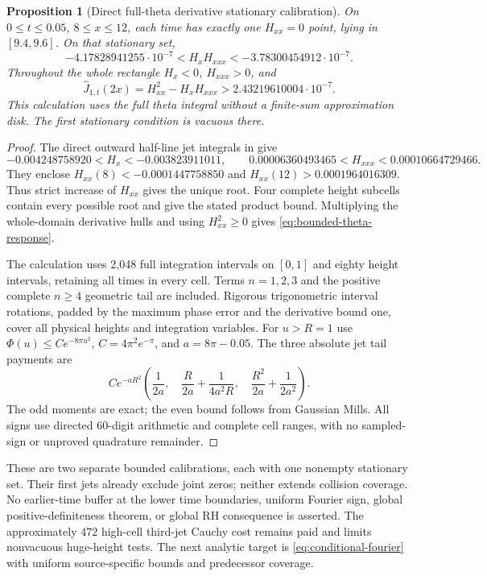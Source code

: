 \documentclass[11pt]{article}
\newtheorem{proposition}[theorem]{Proposition}
\theoremstyle{definition}
\theoremstyle{remark}
\begin{document}
\begin{proposition}[Direct full-theta derivative stationary calibration]
\label{prop:low-theta-sign}
On $0\le t\le0.05$, $8\le x\le12$, each time has exactly one
$H_{xx}=0$ point, lying in $[9.4,9.6]$. On that stationary set,
\[
 -4.17828941255\cdot10^{-7}<H_xH_{xxx}
 <-3.78300454912\cdot10^{-7}.
\]
Throughout the whole rectangle $H_x<0$, $H_{xxx}>0$, and
\begin{equation}
 \widehat J_{1,t}(2x)=H_{xx}^2-H_xH_{xxx}
 >2.43219610004\cdot10^{-7}.
 \label{eq:bounded-theta-response}
\end{equation}
This calculation uses the full theta integral without a finite-sum
approximation disk. The first stationary condition is vacuous there.
\end{proposition}
\begin{proof}
The direct outward half-line jet integrals in \cite{thetacontinuation}
give
\[
 -0.004248758920<H_x<-0.003823911011,\qquad
 0.00006360493465<H_{xxx}<0.00010664729466.
\]
They enclose $H_{xx}(8)<-0.0001447758850$ and
$H_{xx}(12)>0.0001964016309$. Thus strict increase of $H_{xx}$ gives
the unique root. Four complete height subcells contain every possible
root and give the stated product bound. Multiplying the whole-domain
derivative hulls and using $H_{xx}^2\ge0$ gives
\eqref{eq:bounded-theta-response}.

The calculation uses 2,048 full integration intervals on $[0,1]$ and
eighty height intervals, retaining all times in every cell. Terms
$n=1,2,3$ and the positive complete $n\ge4$ geometric tail are included.
Rigorous trigonometric interval rotations, padded by the maximum phase
error and the derivative bound one, cover all physical heights and
integration variables. For $u>R=1$ use
$\Phi(u)\le C e^{-8\pi u^2}$, $C=4\pi^2e^{-\pi}$, and
$a=8\pi-0.05$. The three absolute jet tail payments are
\[
 Ce^{-aR^2}\left(\frac1{2a},\quad
 \frac R{2a}+\frac1{4a^2R},\quad
 \frac{R^2}{2a}+\frac1{2a^2}\right).
\]
The odd moments are exact; the even bound follows from Gaussian Mills.
All signs use directed 60-digit arithmetic and complete cell ranges,
with no sampled-sign or unproved quadrature remainder.
\end{proof}

These are two separate bounded calibrations, each with one nonempty
stationary set. Their first jets already exclude joint zeros; neither
extends collision coverage. No earlier-time buffer at the lower time
boundaries, uniform Fourier sign, global positive-definiteness theorem,
or global RH consequence is asserted. The approximately $472$ high-cell
third-jet Cauchy cost remains paid and limits nonvacuous huge-height
tests. The next analytic target is \eqref{eq:conditional-fourier} with
uniform source-specific bounds and predecessor coverage.
\end{document}

